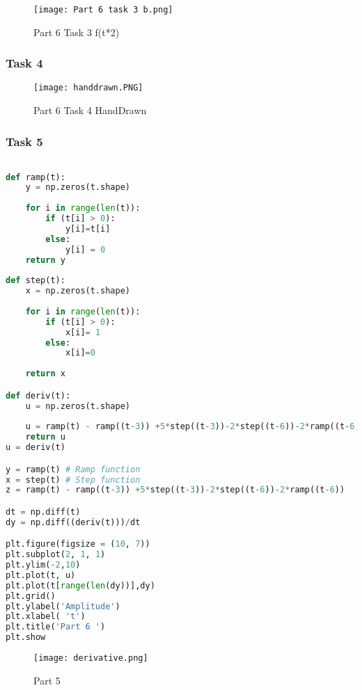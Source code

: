 \documentclass[11pt,a4]{report}
\begin{document}
\begin{figure}[h!]
    \begin{center}
  \caption{Part 6 Task 3 f(t*2)}
  \texttt{[image: Part 6 task 3 b.png]}
\end{center}
\end{figure}
\newpage
\subsubsection{Task 4}

\begin{figure}[h!]
    \begin{center}
  \caption{Part 6 Task 4 HandDrawn}
  \texttt{[image: handdrawn.PNG]}
\end{center}
\end{figure}

\subsubsection{Task 5}

\begin{lstlisting}[language=Python]

def ramp(t):
    y = np.zeros(t.shape)
    
    for i in range(len(t)):
        if (t[i] > 0):
            y[i]=t[i]
        else: 
            y[i] = 0
    return y
        
def step(t):
    x = np.zeros(t.shape)
    
    for i in range(len(t)):
        if (t[i] > 0):
            x[i]= 1
        else:
            x[i]=0
            
    return x

def deriv(t):
    u = np.zeros(t.shape)
    
    u = ramp(t) - ramp((t-3)) +5*step((t-3))-2*step((t-6))-2*ramp((t-6))
    return u
u = deriv(t)

y = ramp(t) # Ramp function
x = step(t) # Step function
z = ramp(t) - ramp((t-3)) +5*step((t-3))-2*step((t-6))-2*ramp((t-6))

dt = np.diff(t)
dy = np.diff((deriv(t)))/dt

plt.figure(figsize = (10, 7))
plt.subplot(2, 1, 1)
plt.ylim(-2,10)
plt.plot(t, u)
plt.plot(t[range(len(dy))],dy)
plt.grid()
plt.ylabel('Amplitude')
plt.xlabel( 't')
plt.title('Part 6 ')
plt.show


\end{lstlisting}

\begin{figure}[h!]
    \begin{center}
  \caption{Part 5}
  \texttt{[image: derivative.png]}
\end{center}
\end{figure}
\end{document}
